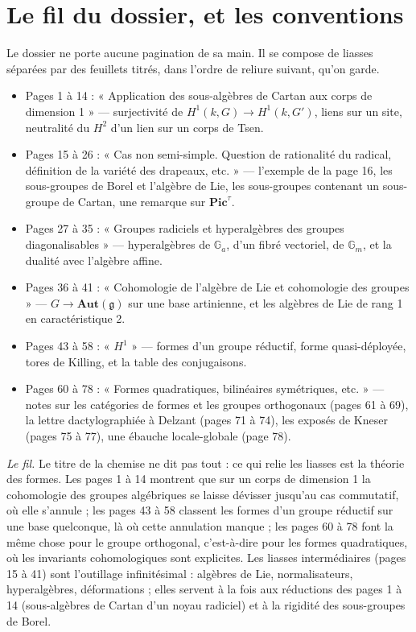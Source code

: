 \documentclass[11pt,a4paper]{article}
\begin{document}
\section*{Le fil du dossier, et les conventions}

Le dossier ne porte aucune pagination de sa main. Il se compose de liasses
séparées par des feuillets titrés, dans l'ordre de reliure suivant, qu'on garde.

\begin{itemize}
\item Pages 1 à 14 : « Application des sous-algèbres de Cartan aux corps de
dimension 1 » — surjectivité de $H^1(k,G) \to H^1(k,G')$, liens sur un site,
neutralité du $H^2$ d'un lien sur un corps de Tsen.
\item Pages 15 à 26 : « Cas non semi-simple. Question de rationalité du
radical, définition de la variété des drapeaux, etc. » — l'exemple de la
page 16, les sous-groupes de Borel et l'algèbre de Lie, les sous-groupes
contenant un sous-groupe de Cartan, une remarque sur $\mathbf{Pic}^{\tau}$.
\item Pages 27 à 35 : « Groupes radiciels et hyperalgèbres des groupes
diagonalisables » — hyperalgèbres de $\mathbb{G}_a$, d'un fibré vectoriel, de
$\mathbb{G}_m$, et la dualité avec l'algèbre affine.
\item Pages 36 à 41 : « Cohomologie de l'algèbre de Lie et cohomologie des
groupes » — $G \to \mathbf{Aut}(\mathfrak{g})$ sur une base artinienne, et les
algèbres de Lie de rang 1 en caractéristique 2.
\item Pages 43 à 58 : « $H^1$ » — formes d'un groupe réductif, forme
quasi-déployée, tores de Killing, et la table des conjugaisons.
\item Pages 60 à 78 : « Formes quadratiques, bilinéaires symétriques,
etc. » — notes sur les catégories de formes et les groupes orthogonaux
(pages 61 à 69), la lettre dactylographiée à Delzant (pages 71 à 74), les
exposés de Kneser (pages 75 à 77), une ébauche locale-globale (page 78).
\end{itemize}

\emph{Le fil.} Le titre de la chemise ne dit pas tout : ce qui relie les
liasses est la théorie des formes. Les pages 1 à 14 montrent que sur un corps
de dimension 1 la cohomologie des groupes algébriques se laisse dévisser
jusqu'au cas commutatif, où elle s'annule ; les pages 43 à 58 classent les
formes d'un groupe réductif sur une base quelconque, là où cette annulation
manque ; les pages 60 à 78 font la même chose pour le groupe orthogonal,
c'est-à-dire pour les formes quadratiques, où les invariants cohomologiques
sont explicites. Les liasses intermédiaires (pages 15 à 41) sont l'outillage
infinitésimal : algèbres de Lie, normalisateurs, hyperalgèbres, déformations ;
elles servent à la fois aux réductions des pages 1 à 14 (sous-algèbres de
Cartan d'un noyau radiciel) et à la rigidité des sous-groupes de Borel.
\end{document}
